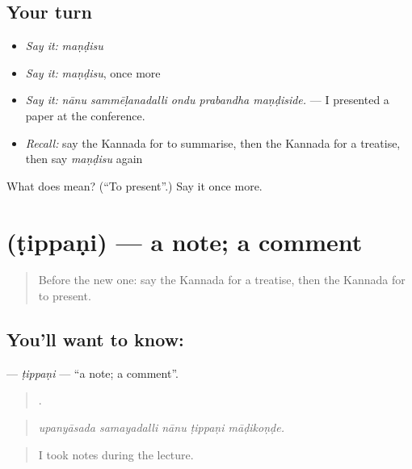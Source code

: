 \subsection*{Your turn}
\begin{itemize}
\raggedright
  \item \emph{Say it:} \emph{maṇḍisu}
  \item \emph{Say it:} \emph{maṇḍisu}, once more
  \item \emph{Say it:} \emph{nānu sammēḷanadalli ondu prabandha maṇḍiside.} — I presented a paper at the conference.
  \item \emph{Recall:} say the Kannada for to summarise, then the Kannada for a treatise, then say \emph{maṇḍisu} again
\end{itemize}

\begin{tcolorbox}[breakable,colback=teal!4,colframe=teal!35!black,title={Before you move on}]
What does  mean? (\textquotedblleft{}To present\textquotedblright{}.) Say it once more.
\end{tcolorbox}
\section[\texorpdfstring{\kn{ಟಿಪ್ಪಣಿ} (ṭippaṇi)}{ಟಿಪ್ಪಣಿ (ṭippaṇi)}]{ (ṭippaṇi) — a note; a comment}

\label{lesson:KA-C409-tippani}



\begin{quote}
Before the new one: say the Kannada for a treatise, then the Kannada for to present.
\end{quote}

\subsection*{You'll want to know: }
\textbf{} — \emph{ṭippaṇi} — \textquotedblleft{}a note; a comment\textquotedblright{}.

\begin{quote}
    .
\end{quote}

\begin{quote}
\emph{upanyāsada samayadalli nānu ṭippaṇi māḍikoṇḍe.}
\end{quote}

\begin{quote}
I took notes during the lecture.
\end{quote}

